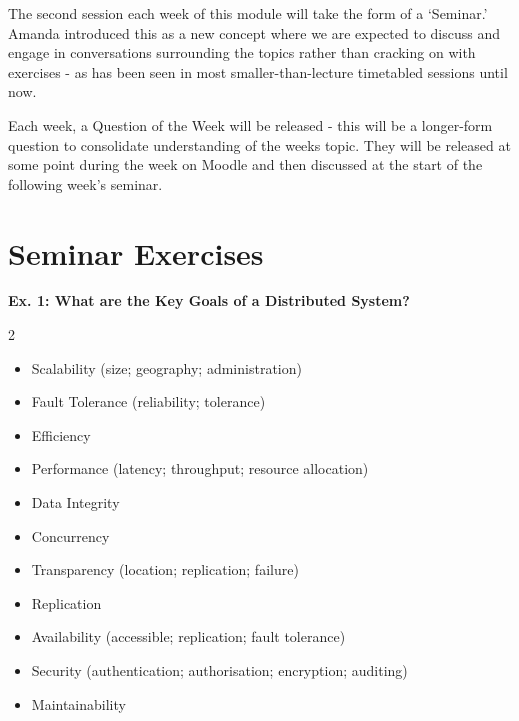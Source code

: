
The second session each week of this module will take the form of a `Seminar.' Amanda introduced this as a new concept where we are expected to discuss and engage in conversations surrounding the topics rather than cracking on with exercises - as has been seen in most smaller-than-lecture timetabled sessions until now.

Each week, a Question of the Week will be released - this will be a longer-form question to consolidate understanding of the weeks topic. They will be released at some point during the week on Moodle and then discussed at the start of the following week's seminar.

\section{Seminar Exercises}

\textbf{Ex. 1: What are the Key Goals of a Distributed System?}
\begin{multicols}{2}
    \begin{itemize}
        \item Scalability (size; geography; administration)
        \item Fault Tolerance (reliability; tolerance)
        \item Efficiency
        \item Performance (latency; throughput; resource allocation)
        \item Data Integrity
        \item Concurrency
        \item Transparency (location; replication; failure)
        \item Replication
        \item Availability (accessible; replication; fault tolerance)
        \item Security (authentication; authorisation; encryption; auditing)
        \item Maintainability
    \end{itemize}
\end{multicols}

